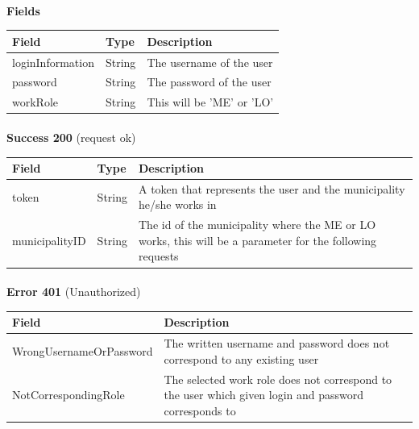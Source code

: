 						\paragraph{}
							\textbf{Fields}
							\begin{table}[!h]
								\begin{tabular}{L{0.25\textwidth}L{0.15\textwidth}L{0.4\textwidth}}
									\toprule
									Field & Type & Description \\
									\midrule
								 	loginInformation & String  & The username of the user \\
								 	password & String & The password of the user \\
								 	workRole & String & This will be 'ME' or 'LO' \\
								 	\bottomrule
								\end{tabular}
							\end{table}
						\paragraph{}
							\textbf{Success 200} (request ok)
							\begin{table}[!h]
								\begin{tabular}{L{0.25\textwidth}L{0.1\textwidth}L{0.45\textwidth}}
									\toprule
									Field & Type & Description \\
									\midrule
									token & String & A token that represents the user and the municipality he/she works in \\
									municipalityID & String & The id of the municipality where the ME or LO works, this will be a parameter for the following requests \\
								 	\bottomrule
								\end{tabular}
							\end{table}
						\clearpage
						\paragraph{}
							\textbf{Error 401} (Unauthorized)
							\begin{table}[!h]
								\begin{tabular}{L{0.4\textwidth}L{0.4\textwidth}}
									\toprule
									Field & Description \\
									\midrule
								  	WrongUsernameOrPassword & The written username and password does not correspond to any existing user \\
								  	NotCorrespondingRole & The selected work role does not correspond to the user which given login and password corresponds to \\
								 	\bottomrule
								\end{tabular}
							\end{table}
							
